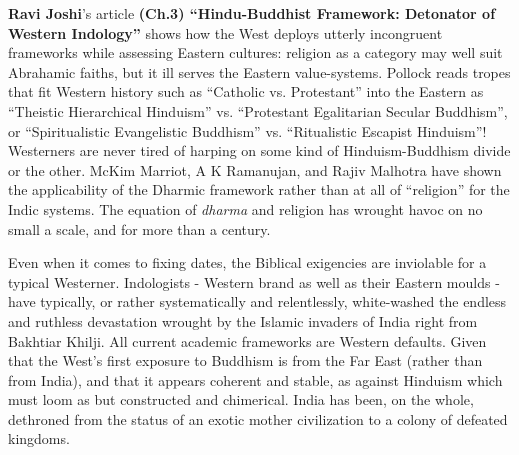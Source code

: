 \textbf{Ravi Joshi}’s article \textbf{(Ch.3) “Hindu-Buddhist Framework: Detonator of Western Indology”} shows how the West deploys utterly incongruent frameworks while assessing Eastern cultures: religion as a category may well suit Abrahamic faiths, but it ill serves the Eastern value-systems. Pollock reads tropes that fit Western history such as “Catholic vs. Protestant” into the Eastern as “Theistic Hierarchical Hinduism'' vs. ``Protestant Egalitarian Secular Buddhism”, or “Spiritualistic Evangelistic Buddhism” vs. “Ritualistic Escapist Hinduism''! Westerners are never tired of harping on some kind of Hinduism-\break Buddhism divide or the other. McKim Marriot, A K Ramanujan, and Rajiv Malhotra have shown the applicability of the Dharmic framework rather than at all of “religion” for the Indic systems. The equation of \textit{dharma} and religion has wrought havoc on no small a scale, and for more than a century.

Even when it comes to fixing dates, the Biblical exigencies are inviolable for a typical Westerner. Indologists - Western brand as well as their Eastern moulds - have typically, or rather systematically and relentlessly, white-washed the endless and ruthless devastation wrought by the Islamic invaders of India right from Bakhtiar Khilji. All current academic frameworks are Western defaults. Given that the West's first exposure to Buddhism is from the Far East (rather than from India), and that it appears coherent and stable, as against Hinduism which must loom as but constructed and chimerical. India has been, on the whole, dethroned from the status of an exotic mother civilization to a colony of defeated kingdoms.

